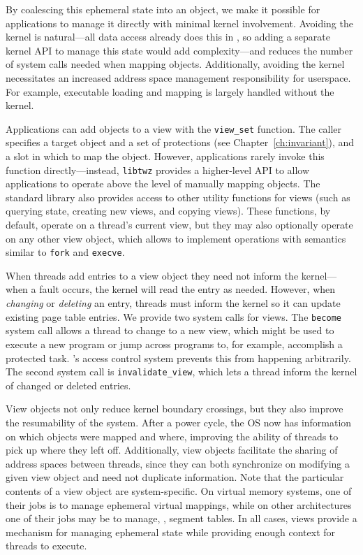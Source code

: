 By coalescing this ephemeral state
into an object, we make it possible for applications to manage it directly with minimal kernel
involvement. Avoiding the kernel is natural---all data access already does this in \Twizzler, so
adding a separate kernel API to manage this state would add complexity---and reduces the number of
system calls needed when mapping objects. Additionally, avoiding the kernel necessitates an
increased address space management responsibility for userspace. For example, executable loading
and mapping is largely handled without the kernel.

Applications can add objects to a view with the \texttt{view\_set} function. The caller specifies a
target object and a set of protections (see Chapter~\ref{ch:invariant}), and a slot in which to
map the object. However, applications rarely invoke this function directly---instead,
\texttt{libtwz} provides a higher-level API to allow applications to operate above the level of
manually mapping objects. The standard library also provides access to other utility functions for
views (such as querying state, creating new views, and copying views). These functions, by default,
operate on a thread's current view, but they may also optionally operate on any other view object,
which allows \Twizzler to implement operations with semantics similar to \texttt{fork} and \texttt{execve}.

When threads add entries to a view object they need not inform the kernel---when
a fault occurs, the kernel will read the entry as needed. However, when \emph{changing} or
\emph{deleting} an entry, threads must inform the kernel so it can update existing page table entries.
We provide two system calls for views. The \texttt{become} system call allows a thread to
change to a new view, which might be used to execute a new program or jump across programs to, for
example, accomplish a protected task. \Twizzler's access control system prevents this from happening
arbitrarily. The second system call is \texttt{invalidate\_view}, which lets a thread inform the
kernel of changed or deleted entries.

View objects not only reduce kernel boundary crossings, but they also improve the resumability of
the system. After a power cycle, the OS now has information on which objects were mapped and where,
improving the ability of threads to pick up where they left off. Additionally, view objects
facilitate the sharing of address spaces between threads, since they can both synchronize on
modifying a given view object and need not duplicate information. Note that the particular contents
of a view object are system-specific. On virtual memory systems, one of their jobs is to manage
ephemeral virtual mappings, while on other architectures one of their jobs may be to manage, \eg, segment
tables. In all cases, views provide a mechanism for managing ephemeral state while
providing enough context for threads to execute.

